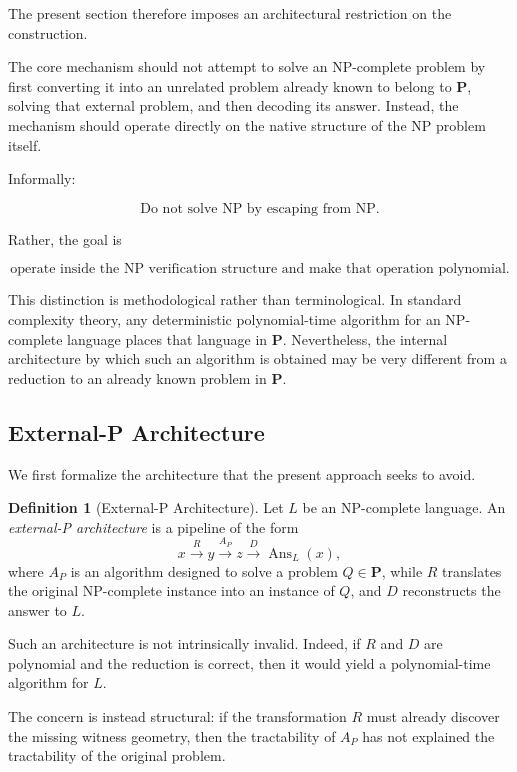 \documentclass[11pt]{article}
\theoremstyle{plain}
\theoremstyle{definition}
\newtheorem{definition}[theorem]{Definition}
\begin{document}
The present section therefore imposes an architectural restriction on the
construction.

The core mechanism should not attempt to solve an NP-complete problem by first
converting it into an unrelated problem already known to belong to
\(\mathbf{P}\), solving that external problem, and then decoding its answer.
Instead, the mechanism should operate directly on the native structure of the
NP problem itself.

Informally:

\[
\boxed{
\text{Do not solve NP by escaping from NP.}
}
\]

Rather, the goal is

\[
\boxed{
\text{operate inside the NP verification structure and make that operation
polynomial.}
}
\]

This distinction is methodological rather than terminological.  In standard
complexity theory, any deterministic polynomial-time algorithm for an
NP-complete language places that language in \(\mathbf{P}\).  Nevertheless,
the internal architecture by which such an algorithm is obtained may be very
different from a reduction to an already known problem in \(\mathbf{P}\).

\subsection{External-P Architecture}

We first formalize the architecture that the present approach seeks to avoid.

\begin{definition}[External-P Architecture]
\label{def:external-p-architecture}
Let \(L\) be an NP-complete language.  An \emph{external-P architecture} is a
pipeline of the form
\[
    x
    \xrightarrow{R}
    y
    \xrightarrow{A_P}
    z
    \xrightarrow{D}
    \operatorname{Ans}_L(x),
\]
where \(A_P\) is an algorithm designed to solve a problem
\(Q\in\mathbf{P}\), while \(R\) translates the original NP-complete instance
into an instance of \(Q\), and \(D\) reconstructs the answer to \(L\).
\end{definition}

Such an architecture is not intrinsically invalid.  Indeed, if \(R\) and
\(D\) are polynomial and the reduction is correct, then it would yield a
polynomial-time algorithm for \(L\).

The concern is instead structural: if the transformation \(R\) must already
discover the missing witness geometry, then the tractability of \(A_P\) has
not explained the tractability of the original problem.
\end{document}
